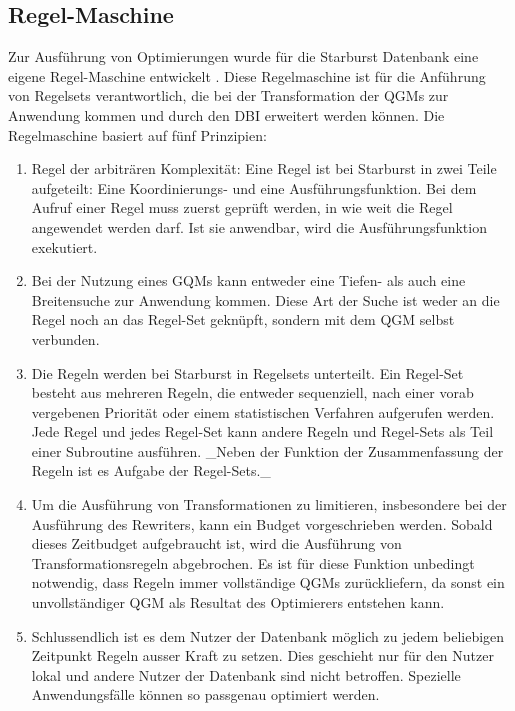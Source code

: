 \subsection{Regel-Maschine}

Zur Ausführung von Optimierungen wurde für die Starburst Datenbank eine eigene Regel-Maschine entwickelt \cite{lohman1988Starbust}. Diese Regelmaschine ist für die Anführung von Regelsets verantwortlich, die bei der Transformation der QGMs zur Anwendung kommen und durch den \ac{DBI}  erweitert werden können. Die Regelmaschine basiert auf fünf Prinzipien:

\begin{enumerate}
\item Regel der arbiträren Komplexität: Eine Regel ist bei Starburst in zwei Teile aufgeteilt: Eine Koordinierungs- und eine Ausführungsfunktion. Bei dem Aufruf einer Regel muss zuerst geprüft werden, in wie weit die Regel angewendet werden darf. Ist sie anwendbar, wird die Ausführungsfunktion exekutiert.

\item Bei der Nutzung eines GQMs kann entweder eine Tiefen- als auch eine Breitensuche zur Anwendung kommen. Diese Art der Suche ist weder an die Regel noch an das Regel-Set geknüpft, sondern mit dem QGM selbst verbunden.


\item Die Regeln werden bei Starburst in Regelsets unterteilt. Ein Regel-Set besteht aus mehreren Regeln, die entweder sequenziell, nach einer vorab vergebenen Priorität oder einem statistischen Verfahren aufgerufen werden. Jede Regel und jedes Regel-Set kann andere Regeln und Regel-Sets als Teil einer Subroutine ausführen. _Neben der Funktion der Zusammenfassung der Regeln ist es Aufgabe der Regel-Sets._

\item Um die Ausführung von Transformationen zu limitieren, insbesondere bei der Ausführung des Rewriters, kann ein Budget vorgeschrieben werden. Sobald dieses Zeitbudget aufgebraucht ist, wird die Ausführung von Transformationsregeln abgebrochen. Es ist für diese Funktion unbedingt notwendig, dass Regeln immer vollständige QGMs zurückliefern, da sonst ein unvollständiger QGM als Resultat des Optimierers entstehen kann.

\item Schlussendlich ist es dem Nutzer der Datenbank möglich zu jedem beliebigen Zeitpunkt Regeln ausser Kraft zu setzen. Dies geschieht nur für den Nutzer lokal und andere Nutzer der Datenbank sind nicht betroffen. Spezielle Anwendungsfälle können so passgenau optimiert werden.
\end{enumerate}

